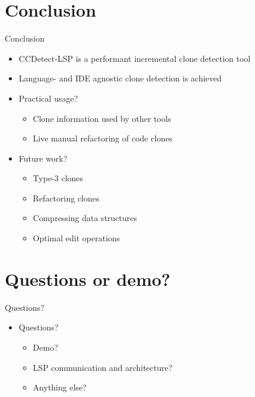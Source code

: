 \documentclass[aspectratio=1610, xcolor=table]{beamer}
\begin{document}
\section{Conclusion}
\begin{frame}{Conclusion}
	\begin{itemize}
        \item CCDetect-LSP is a performant incremental clone detection tool
        \item Language- and IDE agnostic clone detection is achieved
		\item Practical usage?
            \begin{itemize}
                \item Clone information used by other tools
                \item Live manual refactoring of code clones
            \end{itemize}
		\item Future work?
            \begin{itemize}
                \item Type-3 clones
                \item Refactoring clones
                \item Compressing data structures
                \item Optimal edit operations
            \end{itemize}
	\end{itemize}
\end{frame}

\section{Questions or demo?}

\begin{frame}{Questions?}
    \begin{itemize}
    \item Questions?
        \begin{itemize}
            \item Demo?
            \item LSP communication and architecture?
            \item Anything else?
        \end{itemize}
    \end{itemize}
\end{frame}
\end{document}
